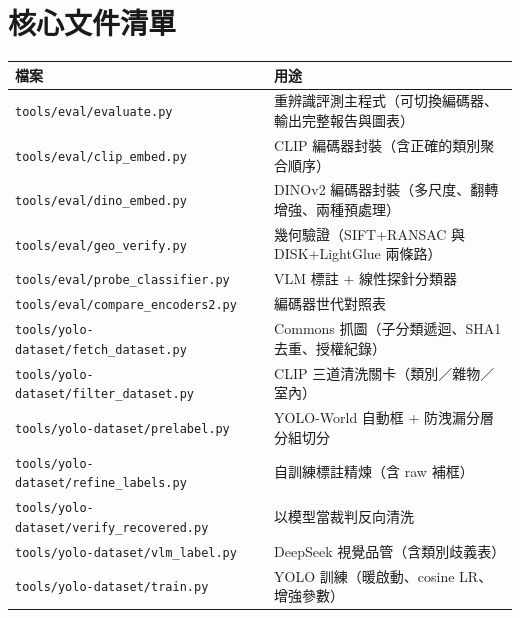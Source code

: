 \documentclass[11pt,a4paper,fontset=windows]{ctexart}
\begin{document}
\section{核心文件清單}

\begin{longtable}{@{}p{5.4cm}p{9.6cm}@{}}
\toprule
\textbf{檔案} & \textbf{用途} \\
\midrule
\endhead
\texttt{tools/eval/evaluate.py} & 重辨識評測主程式（可切換編碼器、輸出完整報告與圖表） \\
\texttt{tools/eval/clip\_embed.py} & CLIP 編碼器封裝（含正確的類別聚合順序） \\
\texttt{tools/eval/dino\_embed.py} & DINOv2 編碼器封裝（多尺度、翻轉增強、兩種預處理） \\
\texttt{tools/eval/geo\_verify.py} & 幾何驗證（SIFT+RANSAC 與 DISK+LightGlue 兩條路） \\
\texttt{tools/eval/probe\_classifier.py} & VLM 標註 + 線性探針分類器 \\
\texttt{tools/eval/compare\_encoders2.py} & 編碼器世代對照表 \\
\texttt{tools/yolo-dataset/fetch\_dataset.py} & Commons 抓圖（子分類遞迴、SHA1 去重、授權紀錄） \\
\texttt{tools/yolo-dataset/filter\_dataset.py} & CLIP 三道清洗關卡（類別／雜物／室內） \\
\texttt{tools/yolo-dataset/prelabel.py} & YOLO-World 自動框 + 防洩漏分層分組切分 \\
\texttt{tools/yolo-dataset/refine\_labels.py} & 自訓練標註精煉（含 raw 補框） \\
\texttt{tools/yolo-dataset/verify\_recovered.py} & 以模型當裁判反向清洗 \\
\texttt{tools/yolo-dataset/vlm\_label.py} & DeepSeek 視覺品管（含類別歧義表） \\
\texttt{tools/yolo-dataset/train.py} & YOLO 訓練（暖啟動、cosine LR、增強參數） \\
\bottomrule
\end{longtable}
\end{document}

